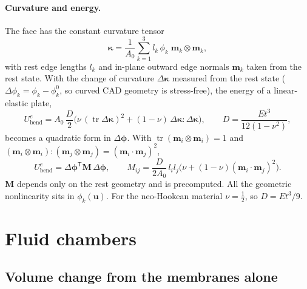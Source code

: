 \documentclass[11pt,a4paper]{article}
\newcommand{\vect}[1]{\bm{#1}}
\newcommand{\uu}{\vect{u}}
\DeclareMathOperator{\tr}{tr}
\theoremstyle{remark}
\begin{document}
\paragraph{Curvature and energy.} The face has the constant curvature tensor
\begin{equation}
\boldsymbol{\kappa} = \frac{1}{A_0}\sum_{k=1}^{3} l_k\,\phi_k\;\vect{m}_k\otimes\vect{m}_k,
\end{equation}
with rest edge lengths $l_k$ and in-plane outward edge normals $\vect{m}_k$ taken from the rest
state. With the change of curvature $\Delta\boldsymbol\kappa$ measured from the rest state
($\Delta\phi_k = \phi_k - \phi_k^0$, so curved CAD geometry is stress-free), the energy of a
linear-elastic plate,
\begin{equation}
U_{\text{bend}}^{e} = A_0\,\frac{D}{2}\Big(\nu\,(\tr\Delta\boldsymbol\kappa)^2 + (1-\nu)\,\Delta\boldsymbol\kappa:\Delta\boldsymbol\kappa\Big),
\qquad D = \frac{E t^3}{12(1-\nu^2)},
\end{equation}
becomes a quadratic form in $\Delta\boldsymbol\phi$. With $\tr(\vect{m}_i\otimes\vect{m}_i) = 1$ and
$(\vect{m}_i\otimes\vect{m}_i):(\vect{m}_j\otimes\vect{m}_j) = (\vect{m}_i\cdot\vect{m}_j)^2$,
\begin{equation}\label{eq:bendmatrix}
U_{\text{bend}}^{e} = \Delta\boldsymbol\phi^{\mathsf T}\mathbf{M}\,\Delta\boldsymbol\phi,
\qquad
M_{ij} = \frac{D}{2A_0}\,l_i l_j\Big(\nu + (1-\nu)(\vect{m}_i\cdot\vect{m}_j)^2\Big).
\end{equation}
$\mathbf{M}$ depends only on the rest geometry and is precomputed. All the geometric nonlinearity
sits in $\phi_k(\uu)$. For the neo-Hookean material $\nu=\tfrac12$, so $D = Et^3/9$.

\section{Fluid chambers}\label{sec:fluid}

\subsection{Volume change from the membranes alone}
\end{document}
